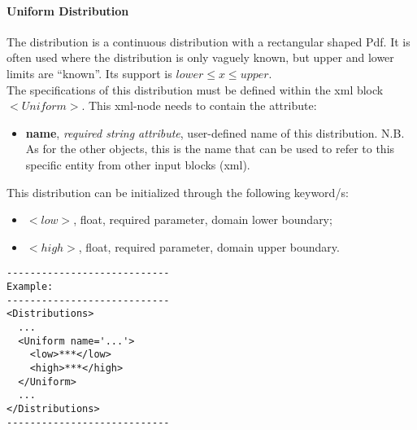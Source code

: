 \paragraph{Uniform Distribution}
\label{Uniform}
The  distribution is a continuous distribution with a rectangular shaped Pdf. It is often used where the distribution is only vaguely known, but upper and lower limits are ``known''. Its support is $lower \le x \le upper$.
\\ The specifications of this distribution must be defined within the xml block $<Uniform>$. This xml-node needs to contain the attribute:
\vspace{-5mm}
\begin{itemize}
\itemsep0em
\item \textbf{name}, \textit{required string attribute}, user-defined name of this distribution. N.B. As for the other objects, this is the name that can be used to refer to this specific entity from other input blocks (xml).   
\end{itemize}
\vspace{-5mm}
This distribution can be initialized through the following keyword/s:
\begin{itemize}
\item $<low>$, float, required parameter, domain lower boundary;
\item $<high>$, float, required parameter, domain upper boundary.
\end{itemize}

\begin{lstlisting}[style=XML]
----------------------------
Example:
----------------------------
<Distributions>
  ...
  <Uniform name='...'>
    <low>***</low>
    <high>***</high>
  </Uniform>
  ...
</Distributions>
----------------------------
\end{lstlisting}

